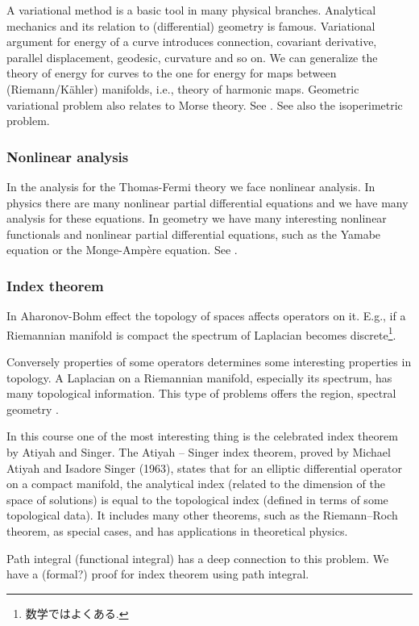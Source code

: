 \documentclass[openany, a4paper, oneside]{jsbook}
\theoremstyle{break}
\theoremstyle{breakdefn}
\begin{document}
A variational method is a basic tool in many physical branches.
Analytical mechanics and its relation to (differential) geometry is famous.
Variational argument for energy of a curve introduces connection,
covariant derivative, parallel displacement, geodesic, curvature and so on.
We can generalize the theory of energy for curves to the one for energy for maps between (Riemann/K\"ahler) manifolds,
i.e., theory of harmonic maps.
Geometric variational problem also relates to Morse theory.
See \cite{SeikiNishikawa1}.
See also the isoperimetric problem.
\subsubsection{Nonlinear analysis}


In the analysis for the Thomas-Fermi theory we face nonlinear analysis.
In physics there are many nonlinear partial differential equations
and we have many analysis for these equations.
In geometry we have many interesting nonlinear functionals and nonlinear partial differential equations,
such as the Yamabe equation or the Monge-Amp\`ere equation.
See \cite{ThierryAubin1}.
\subsubsection{Index theorem}


In Aharonov-Bohm effect the topology of spaces affects operators on it.
E.g., if a Riemannian manifold is compact the spectrum of Laplacian becomes discrete\footnote{数学ではよくある.
 }.

Conversely properties of some operators determines some interesting properties in topology.
A Laplacian on a Riemannian manifold, especially its spectrum, has many topological information.
This type of problems offers the region, spectral geometry \cite{MarkKac2}.

In this course one of the most interesting thing is the celebrated index theorem by Atiyah and Singer.
The Atiyah – Singer index theorem, proved by Michael Atiyah and Isadore Singer (1963),
states that for an elliptic differential operator on a compact manifold,
the analytical index (related to the dimension of the space of solutions) is equal to
the topological index (defined in terms of some topological data).
It includes many other theorems,
such as the Riemann–Roch theorem, as special cases, and has applications in theoretical physics.

Path integral (functional integral) has a deep connection to this problem.
We have a (formal?) proof for index theorem using path integral.
\end{document}
